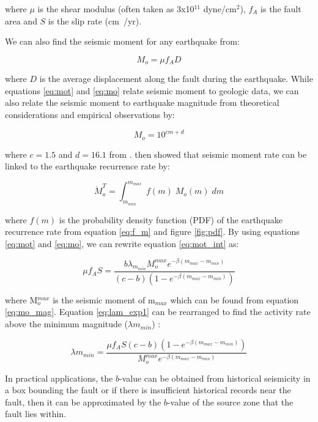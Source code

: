 \begin{enumerate}
where $\mu$ is the shear modulus (often taken as 3x10$^{11}$ dyne/cm$^2$), $f_A$ is the fault area and $S$ is the slip rate (cm~/yr). 

We can also find the seismic moment for any earthquake from:

\begin{equation} \label{eq:mo}
M_o = \mu f_A D
\end{equation}

where $D$ is the average displacement along the fault during the earthquake. While equations \ref{eq:mot} and \ref{eq:mo} relate 
seismic moment to geologic data, we can also relate the seismic moment to earthquake magnitude from theoretical considerations and 
empirical observations by:

\begin{equation} \label{eq:mo_mag}
M_o = 10^{cm+d}
\end{equation}

where $c=1.5$ and $d=16.1$ from \citet{eqrm_Hanks79}. \citet{eqrm_Youngs85} then showed that seismic 
moment rate can be linked to the earthquake recurrence rate by:

\begin{equation} \label{eq:mot_int}
\dot{M}_o^T = \int_{m_{min}}^{m_{max}} \; f(m) \; M_o(m) \; dm
\end{equation}

where $f(m)$ is the probability density function (PDF) of the earthquake recurrence rate from equation \ref{eq:f_m} and figure \ref{fig:pdf}. 
By using equations \ref{eq:mot} and \ref{eq:mo}, we can rewrite equation \ref{eq:mot_int} as:

\begin{equation} \label{eq:lam_exp1}
\mu f_A S= \frac{ b \lambda _{m_{min}} M_o^{max} e^{- \beta (m_{max} - m_{min} )} }  { (c - b) (1-e^{-\beta (m_{max} - m_{min}) })  }
\end{equation}

where M$_o^{max}$ is the seismic moment of m$_{max}$ which can be found from equation \ref{eq:mo_mag}. Equation \ref{eq:lam_exp1} 
can be rearranged to find the activity rate above the minimum magnitude ($\lambda m_{min}$) :

\begin{equation} \label{eq:lam_exp}
\lambda m_{min} = \frac{ \mu f_A S (c - b) (1-e^{-\beta (m_{max} - m_{min}) }) } { M_o^{max}  e^{- \beta (m_{max} - m_{min} )} }
\end{equation}

In practical applications, the $b$-value can be obtained from historical seismicity in a box bounding the 
fault \citep{eqrm_Schwartz84,eqrm_Youngs85} or if there is insufficient historical records near the fault, 
then it can be approximated by the $b$-value of the source zone that the fault lies within. 


\end{enumerate}
